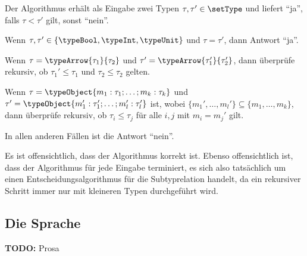 \begin{algorithmus} \label{algorithmus:Minimal_Typing:Subtyprelation}
  Der Algorithmus erh\"alt als Eingabe zwei Typen $\tau,\tau'\in\setType$ und liefert "`ja"', falls $\tau < \tau'$
  gilt, sonst "`nein"'.
  \PROOFCASEbeg
    \item Wenn $\tau,\tau'\in\{\typeBool,\typeInt,\typeUnit\}$ und $\tau = \tau'$, dann Antwort "`ja"'.

    \item Wenn $\tau = \typeArrow{\tau_1}{\tau_2}$ und $\tau' = \typeArrow{\tau_1'}{\tau_2'}$, dann
          \"uberpr\"ufe rekursiv, ob $\tau_1' \le \tau_1$ und $\tau_2 \le \tau_2$ gelten.

    \item Wenn $\tau = \typeObject{m_1:\tau_1;\ldots;m_k:\tau_k}$ und
          $\tau' = \typeObject{m_1':\tau_1';\ldots;m_l':\tau_l'}$ ist, wobei
          $\{m_1',\ldots,m_l'\} \subseteq \{m_1,\ldots,m_k\}$, dann \"uberpr\"ufe rekursiv, ob
          $\tau_i \le \tau_j$ f\"ur alle $i,j$ mit $m_i = m_j'$ gilt.

    \item In allen anderen F\"allen ist die Antwort "`nein"'.
  \PROOFCASEend
\end{algorithmus}
%
Es ist offensichtlich, dass der Algorithmus korrekt ist. Ebenso offensichtlich ist, dass der Algorithmus
f\"ur jede Eingabe terminiert, es sich also tats\"achlich um einen Entscheidungsalgorithmus f\"ur die
Subtyprelation handelt, da ein rekursiver Schritt immer nur mit kleineren Typen durchgef\"uhrt wird.



\subsection{Die Sprache \Lom}

{\bf TODO:} Prosa

